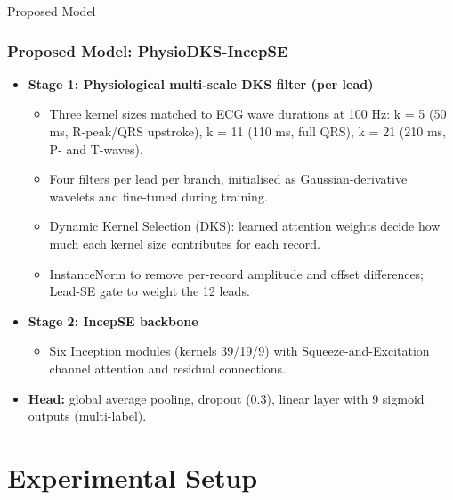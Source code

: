 \documentclass[serif, aspectratio=169]{beamer}
\begin{document}
\begin{frame}{Proposed Model}
	\frametitle<presentation>{Proposed Model: PhysioDKS-IncepSE}
	\begin{itemize}
		\item \textbf{Stage 1: Physiological multi-scale DKS filter (per lead)}
		\begin{itemize}
			\item Three kernel sizes matched to ECG wave durations at 100 Hz: k = 5 (50 ms, R-peak/QRS upstroke), k = 11 (110 ms, full QRS), k = 21 (210 ms, P- and T-waves).
			\item Four filters per lead per branch, initialised as Gaussian-derivative wavelets and fine-tuned during training.
			\item Dynamic Kernel Selection (DKS): learned attention weights decide how much each kernel size contributes for each record.
			\item InstanceNorm to remove per-record amplitude and offset differences; Lead-SE gate to weight the 12 leads.
		\end{itemize}
		\item \textbf{Stage 2: IncepSE backbone}
		\begin{itemize}
			\item Six Inception modules (kernels 39/19/9) with Squeeze-and-Excitation channel attention and residual connections.
		\end{itemize}
		\item \textbf{Head:} global average pooling, dropout (0.3), linear layer with 9 sigmoid outputs (multi-label).
	\end{itemize}
\end{frame}

\section{Experimental Setup}
\end{document}
